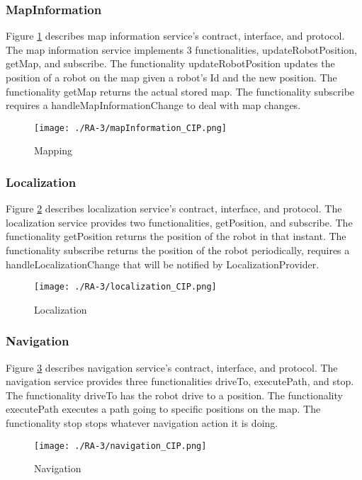 \subsubsection{MapInformation} %
Figure \ref{fig:mapinformation_CIP} describes map information service's contract, interface, and protocol. The map information service implements 3 functionalities, updateRobotPosition, getMap, and subscribe. The functionality updateRobotPosition updates the position of a robot on the map given a robot's Id and the new position. The functionality getMap returns the actual stored map. The functionality subscribe requires a handleMapInformationChange to deal with map changes.
\begin{figure}[ht!]
 \centering
 \texttt{[image: ./RA-3/mapInformation\_CIP.png]}
 \caption{Mapping}
 \label{fig:mapinformation_CIP}
\end{figure}

\subsubsection{Localization} %
Figure \ref{fig:localization_cip} describes localization service's contract, interface, and protocol. The localization service provides two functionalities, getPosition, and subscribe. The functionality getPosition returns the position of the robot in that instant. The functionality subscribe returns the position of the robot periodically, requires a handleLocalizationChange that will be notified by LocalizationProvider.
\begin{figure}[ht!]
 \centering
 \texttt{[image: ./RA-3/localization\_CIP.png]}
 \caption{Localization}
 \label{fig:localization_cip}
\end{figure}

\subsubsection{Navigation} %
Figure \ref{fig:navigation_cip} describes navigation service's contract, interface, and protocol. The navigation service provides three functionalities driveTo, executePath, and stop. The functionality driveTo has the robot drive to a position. The functionality executePath executes a path going to specific positions on the map. The functionality stop stops whatever navigation action it is doing.
\begin{figure}[ht!]
 \centering
 \texttt{[image: ./RA-3/navigation\_CIP.png]}
 \caption{Navigation}
 \label{fig:navigation_cip}
\end{figure}


